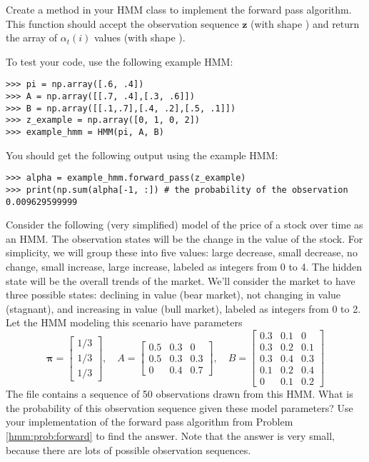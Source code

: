 \begin{problem}\label{hmm:prob:forward}
Create a method  in your HMM class to implement the forward pass algorithm.
This function should accept the observation sequence $\mathbf{z}$ (with shape ) and return the array of $\alpha_t(i)$ values (with shape ).

To test your code, use the following example HMM:
\begin{lstlisting}
>>> pi = np.array([.6, .4])
>>> A = np.array([[.7, .4],[.3, .6]])
>>> B = np.array([[.1,.7],[.4, .2],[.5, .1]])
>>> z_example = np.array([0, 1, 0, 2])
>>> example_hmm = HMM(pi, A, B)
\end{lstlisting}
You should get the following output using the example HMM:
\begin{lstlisting}
>>> alpha = example_hmm.forward_pass(z_example)
>>> print(np.sum(alpha[-1, :]) # the probability of the observation
0.009629599999
\end{lstlisting}
\end{problem}

\begin{problem}\label{hmm:prob:stocks1}
Consider the following (very simplified) model of the price of a stock over time as an HMM.
The observation states will be the change in the value of the stock.
For simplicity, we will group these into five values: large decrease, small decrease, no change, small increase, large increase, labeled as integers from 0 to 4.
The hidden state will be the overall trends of the market.
We'll consider the market to have three possible states: declining in value (bear market), not changing in value (stagnant), and increasing in value (bull market), labeled as integers from 0 to 2.
Let the HMM modeling this scenario have parameters
\[
\boldsymbol\pi=\begin{bmatrix}
1/3 \\ 1/3 \\ 1/3
\end{bmatrix},
\quad
A=\begin{bmatrix}
0.5 & 0.3 & 0 \\
0.5 & 0.3 & 0.3 \\
0 & 0.4 & 0.7
\end{bmatrix},
\quad
B=\begin{bmatrix}
0.3 & 0.1 & 0 \\
0.3 & 0.2 & 0.1 \\
0.3 & 0.4 & 0.3 \\
0.1 & 0.2 & 0.4 \\
0 & 0.1 & 0.2
\end{bmatrix}
\]
The file  contains a sequence of 50 observations drawn from this HMM.
What is the probability of this observation sequence given these model parameters?
Use your implementation of the forward pass algorithm from Problem \ref{hmm:prob:forward} to find the answer.
Note that the answer is very small, because there are lots of possible observation sequences.
\end{problem}

